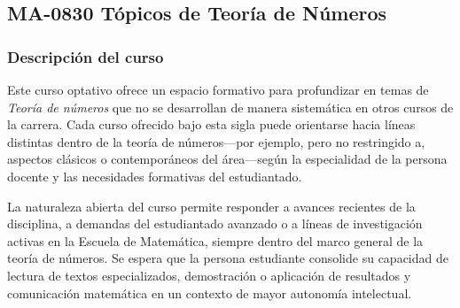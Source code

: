 \newpage
\subsection*{MA-0830 Tópicos de Teoría de Números}

\hypertarget{MA0830}{}
\begin{refsection}
\begin{table}[H]
\end{table}

\subsubsection*{Descripción del curso}

Este curso optativo ofrece un espacio formativo para profundizar en temas de \emph{Teoría de números} que no se desarrollan de manera sistemática en otros cursos de la carrera. Cada curso ofrecido bajo esta sigla puede orientarse hacia líneas distintas dentro de la teoría de números---por ejemplo, pero no restringido a, aspectos clásicos o contemporáneos del área---según la especialidad de la persona docente y las necesidades formativas del estudiantado.

La naturaleza abierta del curso permite responder a avances recientes de la disciplina, a demandas del estudiantado avanzado o a líneas de investigación activas en la Escuela de Matemática, siempre dentro del marco general de la teoría de números. Se espera que la persona estudiante consolide su capacidad de lectura de textos especializados, demostración o aplicación de resultados y comunicación matemática en un contexto de mayor autonomía intelectual.


\end{refsection}
